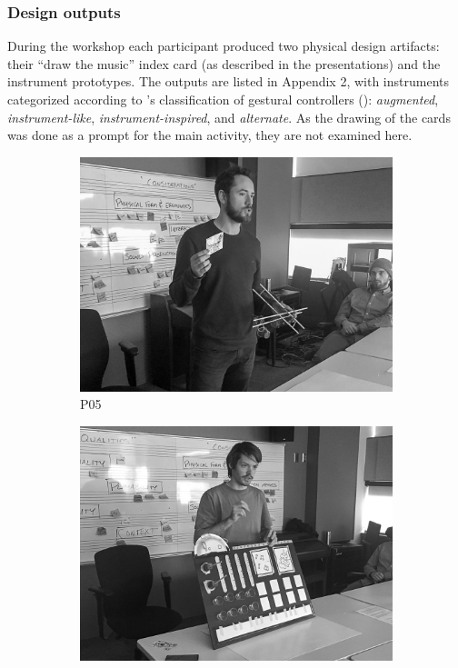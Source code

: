 \documentclass[letterpaper, 12pt]{article}
\begin{document}
\subsubsection{Design outputs}
\label{sec:design-outputs}

During the workshop each participant produced two physical design artifacts: their ``draw the music'' index card (as described in the presentations) and the instrument prototypes. The outputs are listed in Appendix 2, with instruments categorized according to \citeauthor{Miranda2006a}'s classification of gestural controllers (\citeyear{Miranda2006a}): \emph{augmented}, \emph{instrument-like}, \emph{instrument-inspired}, and \emph{alternate}. As the drawing of the cards was done as a prompt for the main activity, they are not examined here. 

\begin{figure}[t]
    \centering
    \begin{subfigure}{0.49\textwidth}
        \centering
        \includegraphics[width=1\textwidth]{P05.jpg}
        \caption{P05}
        \label{fig:presentations_P05}
    \end{subfigure}
    \begin{subfigure}{0.49\textwidth}
        \centering
        \includegraphics[width=1\textwidth]{P06.jpg}

\end{subfigure}
\end{figure}
\end{document}
